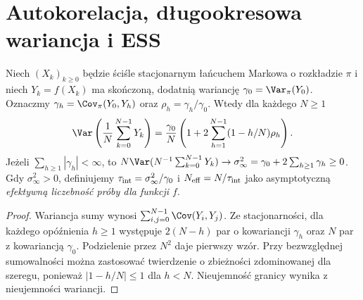 \section{Autokorelacja, długookresowa wariancja i ESS}
\begin{stwierdzenie}
\label{prop:mcmc-autocorrelation}
Niech $(X_k)_{k\ge0}$ będzie ściśle stacjonarnym
łańcuchem Markowa o rozkładzie $\pi$ i niech
$Y_k=f(X_k)$ ma skończoną, dodatnią wariancję
$\gamma_0=\Var_\pi(Y_0)$. Oznaczmy
$\gamma_h=\Cov_\pi(Y_0,Y_h)$ oraz
$\rho_h=\gamma_h/\gamma_0$. Wtedy dla każdego $N\ge1$
\[
 \Var\left(\frac1N\sum_{k=0}^{N-1}Y_k\right)
 =\frac{\gamma_0}{N}\left(1+2\sum_{h=1}^{N-1}
 (1-h/N)\rho_h\right).
\]
Jeżeli $\sum_{h\ge1}|\gamma_h|<\infty$, to
$N\Var(N^{-1}\sum_{k=0}^{N-1}Y_k)\to
\sigma_\infty^2=\gamma_0+2\sum_{h\ge1}\gamma_h\ge0$.
Gdy $\sigma_\infty^2>0$, definiujemy
$\tau_{\rm int}=\sigma_\infty^2/\gamma_0$ i
$N_{\rm eff}=N/\tau_{\rm int}$ jako asymptotyczną
\emph{efektywną liczebność próby dla funkcji $f$}.
\end{stwierdzenie}
\begin{proof}
Wariancja sumy wynosi
$\sum_{i,j=0}^{N-1}\Cov(Y_i,Y_j)$.
Ze stacjonarności, dla każdego opóźnienia $h\ge1$
występuje $2(N-h)$ par o kowariancji $\gamma_h$
oraz $N$ par z kowariancją $\gamma_0$.
Podzielenie przez $N^2$ daje pierwszy wzór.
Przy bezwzględnej sumowalności można zastosować
twierdzenie o zbieżności zdominowanej dla szeregu,
ponieważ $|1-h/N|\le1$ dla $h<N$.
Nieujemność granicy wynika z nieujemności wariancji.
\end{proof}

